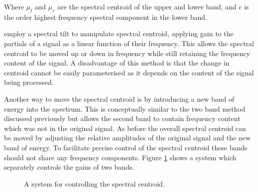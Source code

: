 			Where $\mu_{l}$ and $\mu_{r}$ are the spectral centroid of the upper and lower band, and $c$ is the
			order highest frequency spectral component in the lower band.

			\citet{williams2007perceptually} employ a spectral tilt to manipulate spectral centroid, applying
			gain to the partials of a signal as a linear function of their frequency. This allows the spectral
			centroid to be moved up or down in frequency while still retaining the frequency content of the
			signal. A disadvantage of this method is that the change in centroid cannot be easily parameterised
			as it depends on the content of the signal being processed.

			Another way to move the spectral centroid is by introducing a new band of energy into the spectrum.
			This is conceptually similar to the two band method discussed previously but allows the second band
			to contain frequency content which was not in the original signal. As before the overall spectral
			centroid can be moved by adjusting the relative amplitudes of the original signal and the new band
			of energy. To facilitate precise control of the spectral centroid these bands should not share any
			frequency components. Figure \ref{fig:TwoBandSpectralCentroidSystem} shows a system which
			separately controls the gains of two bands.

			\begin{figure}[h!]
				\centering
				\caption{A system for controlling the spectral centroid.}
				\label{fig:TwoBandSpectralCentroidSystem}
			\end{figure}

